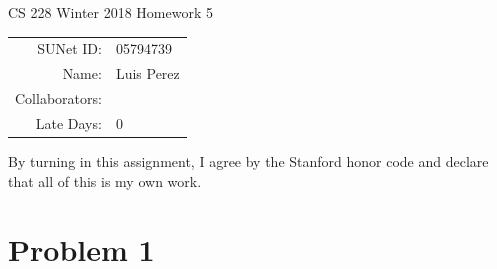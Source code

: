 \documentclass[12pt]{article}
\begin{document}
\begin{center}
{\Large CS 228 Winter 2018 Homework 5}

\begin{tabular}{rl}
SUNet ID: & 05794739 \\
Name: & Luis Perez \\
Collaborators: & \\
Late Days: & 0
\end{tabular}
\end{center}

By turning in this assignment, I agree by the Stanford honor code and declare
that all of this is my own work.

\section*{Problem 1}
\end{document}
